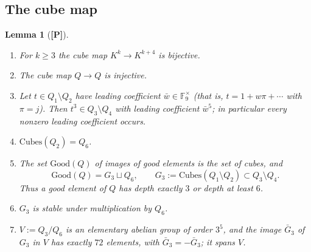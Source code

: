 \documentclass[11pt]{article}
\newcommand{\Fq}{\mathbb F}
\newcommand{\Cubes}{\mathrm{Cubes}}
\newcommand{\Good}{\mathrm{Good}}
\newcommand{\Ptag}{\textnormal{\textbf{[P]}}}
\theoremstyle{plain}
\newtheorem{lemma}[theorem]{Lemma}
\theoremstyle{definition}
\begin{document}
\subsection{The cube map}
\begin{lemma}[\Ptag]\label{lem:cube}
\begin{enumerate}[label=(\alph*)]
\item For $k\ge3$ the cube map $K^k\to K^{k+4}$ is bijective.
\item The cube map $Q\to Q$ is injective.
\item Let $t\in Q_1\setminus Q_2$ have leading coefficient
$\bar w\in\Fq_9^\times$ (that is, $t=1+w\pi+\cdots$ with $\pi=j$).
Then $t^3\in Q_3\setminus Q_4$ with leading coefficient $\bar w^{5}$;
in particular every nonzero leading coefficient occurs.
\item $\Cubes(Q_2)=Q_6$.
\item The set $\Good(Q)$ of images of good elements is the set of cubes,
and
\[
 \Good(Q)=G_3\sqcup Q_6,\qquad G_3:=\Cubes(Q_1\setminus Q_2)\subset Q_3\setminus Q_4 .
\]
Thus a good element of $Q$ has depth exactly $3$ or depth at least $6$.
\item $G_3$ is stable under multiplication by $Q_6$.
\item $V:=Q_3/Q_6$ is an elementary abelian group of order $3^5$, and
the image $\bar G_3$ of $G_3$ in $V$ has exactly $72$ elements, with
$\bar G_3=-\bar G_3$; it spans $V$.
\end{enumerate}
\end{lemma}
\end{document}

